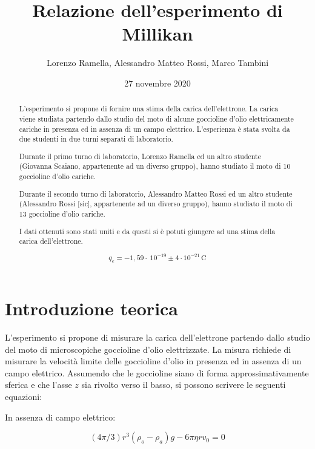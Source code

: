 \documentclass{article}
\title{Relazione dell'esperimento di Millikan}
\author{Lorenzo Ramella, Alessandro Matteo Rossi, Marco Tambini}
\date{27 novembre 2020}
\begin{document}
\maketitle

\begin{abstract}
L’esperimento si propone di fornire una stima della carica dell’elettrone. La carica viene studiata partendo dallo studio del moto di alcune goccioline d’olio elettricamente cariche in presenza ed in assenza di un campo elettrico. L'esperienza è stata svolta da due studenti in due turni separati di laboratorio.

\vspace{4mm}

Durante il primo turno di laboratorio, Lorenzo Ramella ed un altro studente (Giovanna Scaiano, appartenente ad un diverso gruppo), hanno studiato il moto di 10 goccioline d’olio cariche. 

\vspace{4mm}

Durante il secondo turno di laboratorio, Alessandro Matteo Rossi ed un altro studente (Alessandro Rossi [sic], appartenente ad un diverso gruppo), hanno studiato il moto di 13 goccioline d’olio cariche. 

\vspace{4mm}

I dati ottenuti sono stati uniti e da questi si è potuti giungere ad una stima della carica dell'elettrone.

\[q_e = - 1,59 \cdot\ 10^{-19} \pm 4 \cdot 10^{-21} \, \textrm{C}\]

\end{abstract}
\tableofcontents

\section{Introduzione teorica}
L'esperimento si propone di misurare la carica dell'elettrone partendo dallo studio del moto di microscopiche goccioline d'olio elettrizzate. La misura richiede di misurare la velocità limite delle goccioline d'olio in presenza ed in assenza di un campo elettrico. Assumendo che le goccioline siano di forma approssimativamente sferica e che l'asse $z$ sia rivolto verso il basso, si possono scrivere le seguenti equazioni:

In assenza di campo elettrico:

\begin{equation}
(4 \pi /3)r^3 (\rho _o - \rho _a)g - 6\pi \eta r v_0=0 
\end{equation}
\end{document}
